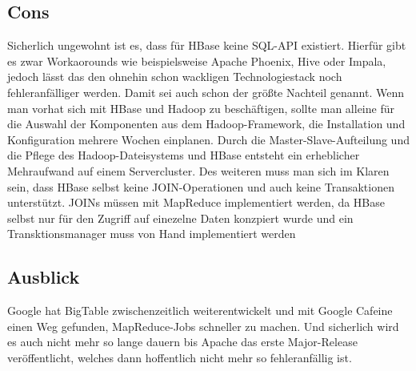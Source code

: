 \subsection{Cons}
Sicherlich ungewohnt ist es, dass für HBase keine SQL-API existiert. Hierfür gibt es zwar Workaorounds wie beispielsweise Apache Phoenix, Hive oder Impala, jedoch lässt das den ohnehin schon wackligen Technologiestack noch fehleranfälliger werden. 
Damit sei auch schon der größte Nachteil genannt. Wenn man vorhat sich mit HBase und Hadoop zu beschäftigen, sollte man alleine für die Auswahl der Komponenten aus dem Hadoop-Framework, die Installation und Konfiguration mehrere Wochen einplanen. Durch die Master-Slave-Aufteilung und die Pflege des Hadoop-Dateisystems und HBase entsteht ein erheblicher Mehraufwand auf einem Servercluster. Des weiteren muss man sich im Klaren sein, dass HBase selbst keine JOIN-Operationen und auch keine Transaktionen unterstützt. JOINs müssen mit MapReduce implementiert werden, da HBase selbst nur für den Zugriff auf einezelne Daten konzpiert wurde und ein Transktionsmanager muss von Hand implementiert werden

\subsection{Ausblick}
Google hat BigTable zwischenzeitlich weiterentwickelt und mit Google Cafeine einen Weg gefunden, MapReduce-Jobs schneller zu machen. Und sicherlich wird es auch nicht mehr so lange dauern bis Apache das erste Major-Release veröffentlicht, welches dann hoffentlich nicht mehr so fehleranfällig ist.


